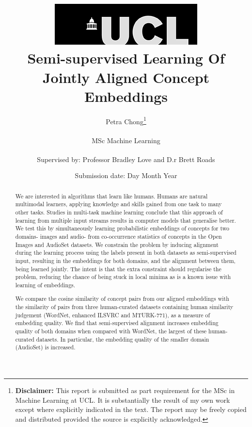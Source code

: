 \documentclass[12pt]{report}
\begin{document}
\title{  	{ \includegraphics[scale=.5]{ucl_logo.png}}\\
{{\Huge Semi-supervised Learning Of Jointly Aligned Concept Embeddings}}\\
		}
\date{Submission date: Day Month Year}
\author{Petra Chong\thanks{
{\bf Disclaimer:}
This report is submitted as part requirement for the MSc in Machine Learning at UCL. It is
substantially the result of my own work except where explicitly indicated in the text.
The report may be freely copied and distributed provided the source is explicitly acknowledged.
}
\\ \\
MSc Machine Learning\\ \\
Supervised by: Professor Bradley Love and D.r Brett Roads}

 
\onehalfspacing
\maketitle
\begin{abstract}
We are interested in algorithms that learn like humans. Humans are natural multimodal learners, applying knowledge and skills gained from one task to many other tasks. Studies in multi-task machine learning conclude that this approach of learning from multiple input streams results in computer models that generalise better. We test this by simultaneously learning probabilistic embeddings of concepts for two domains- images and audio- from co-occurrence statistics of concepts in the Open Images and AudioSet datasets. We constrain the problem by inducing alignment during the learning process using the labels present in both datasets as semi-supervised input, resulting in the embeddings for both domains, and the alignment between them, being learned jointly. The intent is that the extra constraint should regularise the problem, reducing the chance of being stuck in local minima as is a known issue with learning of embeddings.  

We compare the cosine similarity of concept pairs from our aligned embeddings with the similarity of pairs from three human-curated datasets containing human similarity judgement (WordNet, enhanced ILSVRC and MTURK-771), as a measure of embedding quality. We find that semi-supervised alignment increases embedding quality of both domains when compared with WordNet, the largest of these human-curated datasets. In particular, the embedding quality of the smaller domain (AudioSet) is increased. 
\end{abstract}
\end{document}
